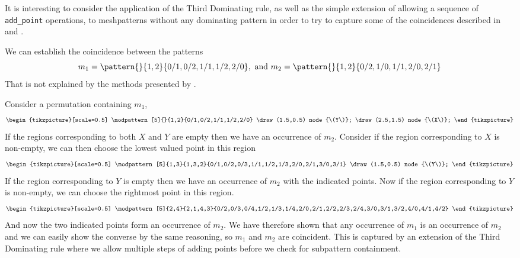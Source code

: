 It is interesting to consider the application of the Third Dominating rule,
as well as the simple extension of allowing a sequence of \texttt{add\_point}
operations, to meshpatterns without any dominating pattern in order to try to
capture some of the coincidences described in
\textcite{DBLP:journals/combinatorics/HilmarssonJSVU15}
 and \textcite{DBLP:journals/corr/ClaessonTU14}.
 \begin{example}
   We can establish the coincidence between the patterns
   \begin{equation*}
     m_1 = \pattern{}{1,2}{0/1,0/2,1/1,1/2,2/0}, \text{ and } m_2 = \pattern{}{1,2}{0/2,1/0,1/1,2/0,2/1}
   \end{equation*}
   That is not explained by the methods presented by \textcite{DBLP:journals/corr/ClaessonTU14}.

   Consider a permutation containing \(m_1\),
   \begin{equation*}
     \begin{tikzpicture}[scale=0.5]
         \modpattern[5]{}{1,2}{0/1,0/2,1/1,1/2,2/0}
         \draw (1.5,0.5) node {\(Y\)};
         \draw (2.5,1.5) node {\(X\)};
     \end{tikzpicture}
   \end{equation*}
   If the regions corresponding to both \(X\) and \(Y\) are empty then we have
   an occurrence of \(m_2\).
   Consider if the region corresponding to \(X\) is non-empty, we can then choose
   the lowest valued point in this region
   \begin{equation*}
     \begin{tikzpicture}[scale=0.5]
         \modpattern[5]{1,3}{1,3,2}{0/1,0/2,0/3,1/1,1/2,1/3,2/0,2/1,3/0,3/1}
         \draw (1.5,0.5) node {\(Y\)};
     \end{tikzpicture}
   \end{equation*}
   If the region corresponding to \(Y\) is empty then we have an occurrence of
   \(m_2\) with the indicated points.
   Now if the region corresponding to \(Y\) is non-empty, we can choose the
   rightmost point in this region.
   \begin{equation*}
     \begin{tikzpicture}[scale=0.5]
         \modpattern[5]{2,4}{2,1,4,3}{0/2,0/3,0/4,1/2,1/3,1/4,2/0,2/1,2/2,2/3,2/4,3/0,3/1,3/2,4/0,4/1,4/2}
     \end{tikzpicture}
   \end{equation*}
   And now the two indicated points form an occurrence of \(m_2\).
   We have therefore shown that any occurrence of \(m_1\) is an occurrence of
   \(m_2\) and we can easily show the converse by the same reasoning, so \(m_1\)
   and \(m_2\) are coincident.
   This is captured by an extension of the Third Dominating rule where we allow
   multiple steps of adding points before we check for subpattern containment.
 \end{example}
